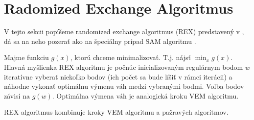 \section {Radomized Exchange Algoritmus}

V tejto sekcii popíšeme randomized exchange algoritmus (REX) predstavený v \cite{rex_harman}, dá sa na neho pozerať ako na špeciálny prípad SAM algoritmu \cite{rex_harman}.

Majme funkciu $g(x)$, ktorú chceme minimalizovať. T.j. nájsť $\min_x g(x)$. Hlavná myšlienka REX algoritmu je počnúc inicializovaným regulárnym bodom $w$ iteratívne vyberať niekoľko bodov (ich počet sa bude líšiť v rámci iterácii) a náhodne vykonať optimálnu výmenu váh medzi vybranými bodmi. Voľba bodov závisí na $g(w)$.
Optimálna výmena váh je analogická kroku VEM algoritmu.

REX algoritmus kombinuje kroky VEM algoritmu a pažravých algoritmov.

